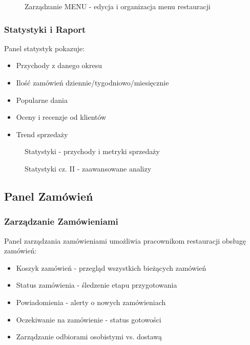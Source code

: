\documentclass[12pt,a4paper,utf-8]{article}
\begin{document}
\begin{figure}[H]
    \centering
    \caption{Zarządzanie MENU  -  edycja i organizacja menu restauracji}
    \label{fig:menu_management}
\end{figure}

\subsubsection{Statystyki i Raport}

Panel statystyk pokazuje:

\begin{itemize}
    \item Przychody z danego okresu
    \item Ilość zamówień dziennie/tygodniowo/miesięcznie
    \item Popularne dania
    \item Oceny i recenzje od klientów
    \item Trend sprzedaży
\end{itemize}

\begin{figure}[H]
    \centering
    \caption{Statystyki  -  przychody i metryki sprzedaży}
    \label{fig:statistics}
\end{figure}

\begin{figure}[H]
    \centering
    \caption{Statystyki cz. II  -  zaawansowane analizy}
    \label{fig:statistics_2}
\end{figure}

\subsection{Panel Zamówień}

\subsubsection{Zarządzanie Zamówieniami}

Panel zarządzania zamówieniami umożliwia pracownikom restauracji obsługę zamówień:

\begin{itemize}
    \item Koszyk zamówień  -  przegląd wszystkich bieżących zamówień
    \item Status zamówienia  -  śledzenie etapu przygotowania
    \item Powiadomienia  -  alerty o nowych zamówieniach
    \item Oczekiwanie na zamówienie  -  status gotowości
    \item Zarządzanie odbiorami osobistymi vs. dostawą
\end{itemize}
\end{document}
